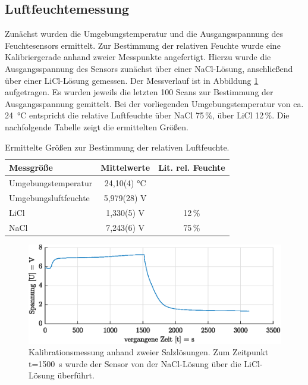 \subsection{Luftfeuchtemessung}
Zunächst wurden die Umgebungstemperatur und die Ausgangsspannung des Feuchtesensors ermittelt. Zur Bestimmung der relativen Feuchte wurde eine Kalibriergerade anhand zweier Messpunkte angefertigt. Hierzu wurde die Ausgangsspannung des Sensors zunächst über einer NaCl-Lösung, anschließend über einer LiCl-Lösung gemessen. Der Messverlauf ist in Abbildung \ref{fig:cal} aufgetragen. Es wurden jeweils die letzten 100 Scans zur Bestimmung der Ausgangsspannung gemittelt. Bei der vorliegenden Umgebungstemperatur von ca. \SI{24}{\celsius} entspricht die relative Luftfeuchte über NaCl 75\,\%, über LiCl 12\,\%. Die nachfolgende Tabelle zeigt die ermittelten Größen.
\begin{table}[H]
	\centering
	\caption{Ermittelte Größen zur Bestimmung der relativen Luftfeuchte.}
	\label{tab:amb}
	\begin{tabular}{lS[separate-uncertainty,table-parse-only,table-figures-uncertainty = 1]c}
		
		\toprule
		
		\textbf{Messgröße} & \textbf{Mittelwerte} & \textbf{Lit. rel. Feuchte}\\
		\midrule
		Umgebungstemperatur & 24,10(4) \si{\celsius} &\\
		Umgebungsluftfeuchte & 5,979(28) \si{\volt} & \\
		LiCl & 1,330(5) \si{\volt} & 12\,\%  \\
		NaCl & 7,243(6) \si{\volt} & 75\,\%  \\
		\bottomrule
	\end{tabular}
\end{table}

\begin{figure}[H]
	\centering
	\includegraphics[width=\textwidth]{../DATA/Messreihe_Feuchtekalibration.eps}
	\caption[Kalibrationsmessung]{Kalibrationsmessung anhand zweier Salzlösungen. Zum Zeitpunkt t=\SI{1500}{\second} wurde der Sensor von der NaCl-Lösung über die LiCl-Lösung überführt.}
	\label{fig:cal}
\end{figure}

